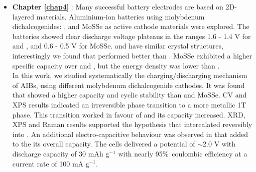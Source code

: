 \begin{itemize}

\item \textbf{Chapter \ref{chap4}} : Many successful battery electrodes are based on 2D-layered materials. Aluminium-ion batteries using molybdenum dichalcogenides: ,  and MoSSe as active cathode materials were explored. The batteries showed clear discharge voltage plateaus in the ranges 1.6 - 1.4 V for  and , and 0.6 - 0.5 V for MoSSe.  and  have similar crystal structures, interestingly we found that  performed better than . MoSSe exhibited a higher specific capacity over  and , but the energy density was lower than .  \\
In this work, we studied systematically the charging/discharging mechanism of AIBs, using different molybdenum dichalcogenide cathodes. It was found that  showed a higher capacity and cyclic stability than  and MoSSe. CV and XPS results indicated an irreversible phase transition to a more metallic 1T phase. This transition worked in favour of  and its capacity increased. XRD, XPS and Raman results supported the hypothesis that  intercalated reversibly into . An additional electro-capacitive behaviour was observed in  that added to the its overall capacity. The cells delivered a potential of $\sim$2.0 V with discharge capacity of 30 mAh g$^{-1}$ with nearly 95\%\ coulombic efficiency at a current rate of 100 mA g$^{-1}$.


\end{itemize}
